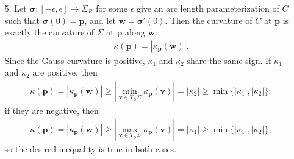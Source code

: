 \documentclass[a4paper,12pt]{article}
\newcommand{\bs}{\boldsymbol}
\theoremstyle{remark}
\begin{document}
\begin{enumerate}
    \item[5.]
        Let $\bs{\sigma} : [-\epsilon, \epsilon] \to \Sigma_R$ for some $\epsilon$ give an arc length parameterization of $C$ such that $\bs{\sigma}(0) = \bs{p}$, and let $\bs{w} = \bs{\sigma}'(0)$. Then the curvature of $C$ at $\bs{p}$ is exactly the curvature of $\Sigma$ at $\bs{p}$ along $\bs{w}$:
        \begin{align*}
            \kappa(\bs{p}) = |\kappa_{\bs{p}}(\bs{w})|.
        \end{align*}
        Since the Gauss curvature is positive, $\kappa_1$ and $\kappa_2$ share the same sign. If $\kappa_1$ and $\kappa_2$ are positive, then
        \begin{align*}
            \kappa(\bs{p}) = |\kappa_{\bs{p}}(\bs{w})| \geq |\min_{\bs{v} \in T_{\bs{p}}\Sigma} \kappa_{\bs{p}}(\bs{v})| = |\kappa_2| \geq \min\{ |\kappa_1|, |\kappa_2| \};
        \end{align*}
        if they are negative, then
        \begin{align*}
            \kappa(\bs{p}) = |\kappa_{\bs{p}}(\bs{w})| \geq |\max_{\bs{v} \in T_{\bs{p}}\Sigma} \kappa_{\bs{p}}(\bs{v})| = |\kappa_1| \geq \min\{ |\kappa_1|, |\kappa_2| \},
        \end{align*}
        so the desired inequality is true in both cases.


\end{enumerate}
\end{document}
